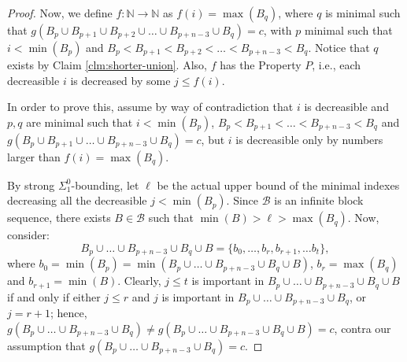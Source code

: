 \documentclass[10pt,a4paper]{amsart}
\newcommand\Nat{\mathbb{N}}
\begin{document}
\begin{proof}
\bigskip

Now, we define $f: \Nat \to \Nat$ as $f(i) = \max(B_q)$, where $q$ is minimal such that $g(B_p \cup B_{p+1} \cup B_{p+2} \cup \ldots \cup B_{p+n-3} \cup B_q) =c$, with $p$ minimal such that $i < \min(B_p)$ and $B_p < B_{p+1} < B_{p+2} < \ldots < B_{p+n-3} < B_q$. Notice that $q$ exists by Claim \ref{clm:shorter-union}. Also, $f$ has the Property $P$, i.e., each decreasible $i$ is decreased by some $j \leq f(i)$.

In order to prove this, assume by way of contradiction that $i$ is decreasible and $p,q$ are minimal such that $i < \min(B_p)$, $B_p < B_{p+1} < \ldots < B_{p+n-3} < B_q$ and $g(B_p \cup B_{p+1} \cup \ldots \cup B_{p+n-3} \cup B_q) = c$, but $i$ is decreasible only by numbers larger than $f(i) = \max(B_q)$. 

By strong $\Sigma^0_1$-bounding, let $\ell$ be the actual upper bound of the minimal indexes decreasing all the decreasible $j < \min(B_p)$. Since $\mathcal{B}$ is an infinite block sequence, there exists $B \in \mathcal{B}$ such that $\min(B) > \ell > \max(B_q)$. Now, consider:
$$
B_p \cup \ldots \cup B_{p+n-3} \cup B_q \cup B = \{b_0, \ldots, b_r, b_{r+1}, \ldots b_t\},$$
where $b_0 = \min(B_p) = \min(B_p \cup \ldots \cup B_{p+n-3} \cup B_q \cup B)$, $b_r = \max(B_q)$ and $b_{r+1} = \min(B)$. Clearly, $j \leq t$ is important in $B_p \cup \ldots \cup B_{p+n-3} \cup B_q \cup B$ if and only if either $j \leq r$ and $j$ is important in $B_p \cup \ldots \cup B_{p+n-3} \cup B_q$, or $j = r + 1$; hence, $g(B_p \cup \ldots \cup B_{p+n-3} \cup B_q) \neq g(B_p \cup \ldots \cup B_{p+n-3} \cup B_q \cup B) = c$, contra our assumption that $g(B_p \cup \ldots \cup B_{p+n-3} \cup B_q) = c$.
\end{proof}
\end{document}
